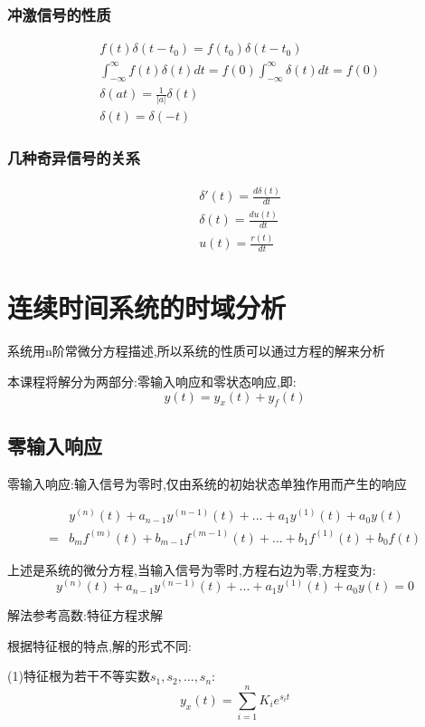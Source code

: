 \documentclass[12pt, a4paper, oneside]{ctexart}
\begin{document}
\subsubsection{冲激信号的性质}
\begin{align*}
    &f(t)\delta(t-t_0)=f(t_0)\delta(t-t_0)\\
    &\int_{-\infty}^{\infty}f(t)\delta(t)dt=f(0)\int_{-\infty}^{\infty}\delta(t)dt=f(0)\\
    &\delta(at)=\frac{1}{|a|}\delta(t)\\
    &\delta(t)=\delta(-t)
\end{align*}

\subsubsection{几种奇异信号的关系}
\begin{align*}
    &\delta'(t)=\frac{d\delta(t)}{dt}\\
    &\delta(t)=\frac{du(t)}{dt}\\
    &u(t)=\frac{r(t)}{dt}
\end{align*}

\section{连续时间系统的时域分析}
系统用n阶常微分方程描述,所以系统的性质可以通过方程的解来分析

本课程将解分为两部分:零输入响应和零状态响应,即:
\[
    y(t)=y_x(t)+y_f(t)
\]

\subsection{零输入响应}
零输入响应:输入信号为零时,仅由系统的初始状态单独作用而产生的响应

\begin{align*}
    &y^{(n)}(t)+a_{n-1}y^{(n-1)}(t)+...+a_1y^{(1)}(t)+a_0y(t)\\
    = &b_mf^{(m)}(t)+b_{m-1}f^{(m-1)}(t)+...+b_1f^{(1)}(t)+b_0f(t)
\end{align*}

上述是系统的微分方程,当输入信号为零时,方程右边为零,方程变为:
\[
    y^{(n)}(t)+a_{n-1}y^{(n-1)}(t)+...+a_1y^{(1)}(t)+a_0y(t)=0
\]

解法参考高数:特征方程求解

根据特征根的特点,解的形式不同:

(1)特征根为若干不等实数$s_1,s_2,...,s_n$:
\[
    y_x(t)=\sum_{i=1}^{n}K_ie^{s_i t}
\]
\end{document}
